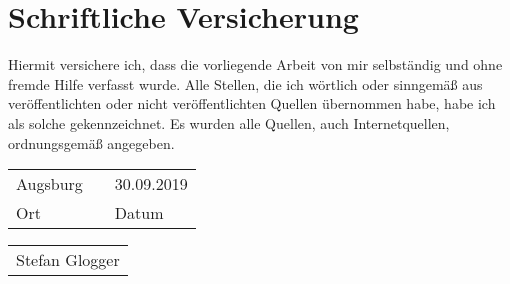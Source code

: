 \chapter{Schriftliche Versicherung}

\noindent Hiermit versichere ich, dass die vorliegende Arbeit von mir selbständig und ohne fremde Hilfe verfasst wurde. Alle Stellen, die ich wörtlich oder sinngemäß aus veröffentlichten oder nicht veröffentlichten Quellen übernommen habe, habe ich als solche gekennzeichnet. Es wurden alle Quellen, auch Internetquellen, ordnungsgemäß angegeben.

\vspace*{1cm}
\noindent\begin{tabular}{lll}
	Augsburg & & 30.09.2019\\\cmidrule{1-1}\cmidrule{3-3}
	Ort & & Datum
\end{tabular}

\vspace*{2cm}
\begin{flushright}
	\begin{tabular}{p{3.0cm}}
		\midrule
		Stefan Glogger
	\end{tabular}
\end{flushright}